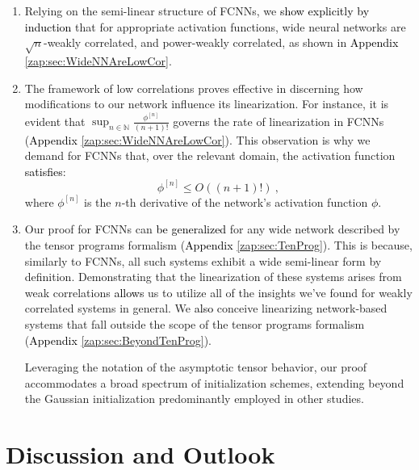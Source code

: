 \documentclass{article} %
\begin{document}
\begin{enumerate}
\item
Relying on the semi-linear structure of FCNNs, we \textcolor{black}{show explicitly by induction} that for appropriate activation functions, wide neural networks are $\sqrt{n}$-weakly correlated, and power-weakly correlated, as shown in \textcolor{black}{Appendix} \ref{zap:sec:WideNNAreLowCor}.

\item 
The framework of low correlations proves effective in discerning how modifications to our network influence its linearization. For instance, it is evident that \(\sup_{n\in\mathbb{N}}\frac{\phi^{\left[n\right]}}{(n+1)!}\) governs the rate of linearization in FCNNs (\textcolor{black}{Appendix} \ref{zap:sec:WideNNAreLowCor}). This observation is why we demand for FCNNs that, over the relevant domain, the activation function \textcolor{black}{satisfies}:
\begin{equation}
\phi^{\left[n\right]}\leq O\left(\left(n+1\right)!\right) \ ,
\label{eq:BoundDerActivation}
\end{equation}
where \(\phi^{[n]}\) is the \(n\)-th derivative of the network's activation function \textcolor{black}{\(\phi\)}.

\item 
Our proof for FCNNs can \textcolor{black}{be generalized} for any wide network described by the tensor programs formalism (\textcolor{black}{Appendix} \ref{zap:sec:TenProg}). This is because, similarly to FCNNs, all such systems exhibit a wide semi-linear form by definition. Demonstrating that the linearization of these systems arises from weak correlations \textcolor{black}{allows} us to utilize all of the insights we've found for weakly correlated systems in general. We \textcolor{black}{also} conceive linearizing network-based systems that fall outside the scope of the tensor programs formalism (\textcolor{black}{Appendix} \ref{zap:sec:BeyondTenProg}).

Leveraging the notation of the asymptotic tensor behavior, our proof accommodates a broad spectrum of initialization schemes, extending beyond the Gaussian initialization predominantly employed in other studies. 

\end{enumerate}

\section{Discussion and Outlook}
\label{sec:DiscussionAndOutlook}
\end{document}
